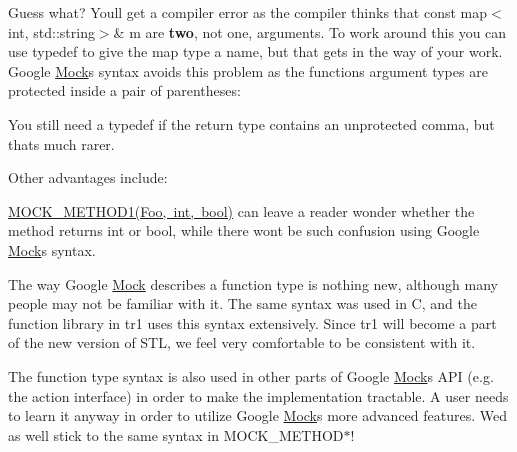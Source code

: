 Guess what? You\textquotesingle{}ll get a compiler error as the compiler thinks that {\ttfamily const map$<$int, std\+::string$>$\& m} are {\bfseries{two}}, not one, arguments. To work around this you can use {\ttfamily typedef} to give the map type a name, but that gets in the way of your work. Google \mbox{\hyperlink{class_mock}{Mock}}\textquotesingle{}s syntax avoids this problem as the function\textquotesingle{}s argument types are protected inside a pair of parentheses\+: 
\begin{DoxyCode}{0}
\DoxyCodeLine{\textcolor{comment}{// This compiles fine.}}
\end{DoxyCode}


You still need a {\ttfamily typedef} if the return type contains an unprotected comma, but that\textquotesingle{}s much rarer.

Other advantages include\+:
\begin{DoxyEnumerate}
\item {\ttfamily \mbox{\hyperlink{_obj__test_2lib_2googletest-release-1_88_81_2googlemock_2include_2gmock_2gmock-generated-function-mockers_8h_ac49d366be035ee87b73264a29059cdc7}{M\+O\+C\+K\+\_\+\+M\+E\+T\+H\+O\+D1(\+Foo, int, bool)}}} can leave a reader wonder whether the method returns {\ttfamily int} or {\ttfamily bool}, while there won\textquotesingle{}t be such confusion using Google \mbox{\hyperlink{class_mock}{Mock}}\textquotesingle{}s syntax.
\end{DoxyEnumerate}
\begin{DoxyEnumerate}
\item The way Google \mbox{\hyperlink{class_mock}{Mock}} describes a function type is nothing new, although many people may not be familiar with it. The same syntax was used in C, and the {\ttfamily function} library in {\ttfamily tr1} uses this syntax extensively. Since {\ttfamily tr1} will become a part of the new version of S\+TL, we feel very comfortable to be consistent with it.
\end{DoxyEnumerate}
\begin{DoxyEnumerate}
\item The function type syntax is also used in other parts of Google \mbox{\hyperlink{class_mock}{Mock}}\textquotesingle{}s A\+PI (e.\+g. the action interface) in order to make the implementation tractable. A user needs to learn it anyway in order to utilize Google \mbox{\hyperlink{class_mock}{Mock}}\textquotesingle{}s more advanced features. We\textquotesingle{}d as well stick to the same syntax in {\ttfamily M\+O\+C\+K\+\_\+\+M\+E\+T\+H\+O\+D$\ast$}!
\end{DoxyEnumerate}

